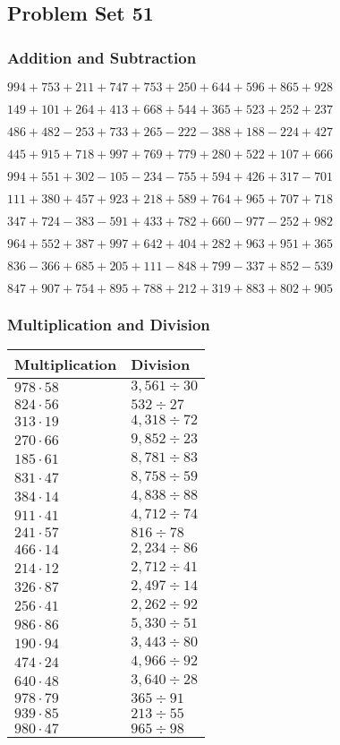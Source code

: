 \hypertarget{problem-set-51-1}{%
\subsection{Problem Set 51}\label{problem-set-51-1}}

\hypertarget{addition-and-subtraction-151}{%
\subsubsection{Addition and
Subtraction}\label{addition-and-subtraction-151}}

\(994 + 753 + 211 + 747 + 753 + 250 + 644 + 596 + 865 + 928\)

\(149 + 101 + 264 + 413 + 668 + 544 + 365 + 523 + 252 + 237\)

\(486 + 482 - 253 + 733 + 265 - 222 - 388 + 188 - 224 + 427\)

\(445 + 915 + 718 + 997 + 769 + 779 + 280 + 522 + 107 + 666\)

\(994 + 551 + 302 - 105 - 234 - 755 + 594 + 426 + 317 - 701\)

\(111 + 380 + 457 + 923 + 218 + 589 + 764 + 965 + 707 + 718\)

\(347 + 724 - 383 - 591 + 433 + 782 + 660 - 977 - 252 + 982\)

\(964 + 552 + 387 + 997 + 642 + 404 + 282 + 963 + 951 + 365\)

\(836 - 366 + 685 + 205 + 111 - 848 + 799 - 337 + 852 - 539\)

\(847 + 907 + 754 + 895 + 788 + 212 + 319 + 883 + 802 + 905\)

\hypertarget{multiplication-and-division-151}{%
\subsubsection{Multiplication and
Division}\label{multiplication-and-division-151}}

\begin{longtable}[]{@{}ll@{}}
\toprule
Multiplication & Division\tabularnewline
\midrule
\endhead
\(978 \cdot 58\) & \(3,561÷30\)\tabularnewline
\(824 \cdot 56\) & \(532÷27\)\tabularnewline
\(313 \cdot 19\) & \(4,318÷72\)\tabularnewline
\(270 \cdot 66\) & \(9,852÷23\)\tabularnewline
\(185 \cdot 61\) & \(8,781÷83\)\tabularnewline
\(831 \cdot 47\) & \(8,758÷59\)\tabularnewline
\(384 \cdot 14\) & \(4,838÷88\)\tabularnewline
\(911 \cdot 41\) & \(4,712÷74\)\tabularnewline
\(241 \cdot 57\) & \(816÷78\)\tabularnewline
\(466 \cdot 14\) & \(2,234÷86\)\tabularnewline
\(214 \cdot 12\) & \(2,712÷41\)\tabularnewline
\(326 \cdot 87\) & \(2,497÷14\)\tabularnewline
\(256 \cdot 41\) & \(2,262÷92\)\tabularnewline
\(986 \cdot 86\) & \(5,330÷51\)\tabularnewline
\(190 \cdot 94\) & \(3,443÷80\)\tabularnewline
\(474 \cdot 24\) & \(4,966÷92\)\tabularnewline
\(640 \cdot 48\) & \(3,640÷28\)\tabularnewline
\(978 \cdot 79\) & \(365÷91\)\tabularnewline
\(939 \cdot 85\) & \(213÷55\)\tabularnewline
\(980 \cdot 47\) & \(965÷98\)\tabularnewline
\bottomrule
\end{longtable}

